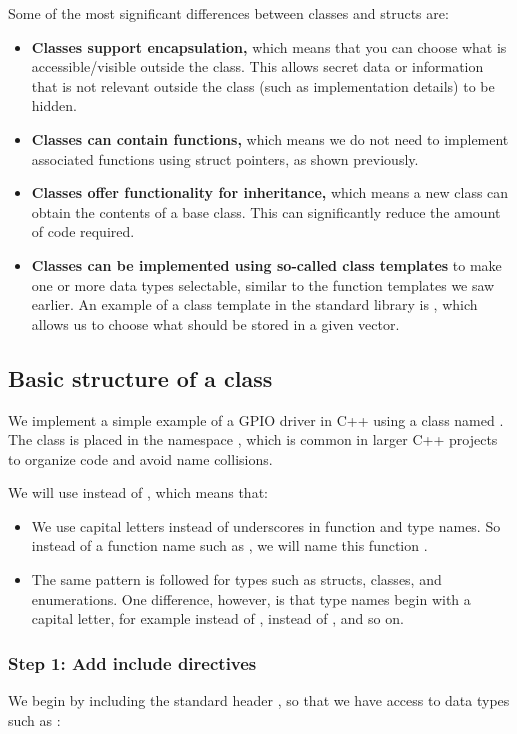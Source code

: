 Some of the most significant differences between classes and structs are:
\begin{itemize}
  \item \textbf{Classes support encapsulation,} which means that you can choose what is
    accessible/visible outside the class. This allows secret data or information that is not
    relevant outside the class (such as implementation details) to be hidden.
  \item \textbf{Classes can contain functions,} which means we do not need to implement associated
    functions using struct pointers, as shown previously.
  \item \textbf{Classes offer functionality for inheritance,} which means a new class can obtain
    the contents of a base class. This can significantly reduce the amount of code required.
  \item \textbf{Classes can be implemented using so-called class templates} to make one or more
    data types selectable, similar to the function templates we saw earlier. An example of a class
    template in the standard library is , which allows us to choose what should
    be stored in a given vector.
\end{itemize}

\subsection{Basic structure of a class}
\label{c2:sec:structure}
We implement a simple example of a GPIO driver in C++ using a class named . The class is
placed in the namespace , which is common in larger C++ projects to organize
code and avoid name collisions.

We will use  instead of , which means that:
\begin{itemize}
  \item We use capital letters instead of underscores in function and type names. So instead of a
    function name such as , we will name this function
    .
  \item The same pattern is followed for types such as structs, classes, and enumerations. One
    difference, however, is that type names begin with a capital letter, for example 
    instead of ,  instead of , and so on.
\end{itemize}

\subsubsection{Step 1: Add include directives}
We begin by including the standard header , so that we have access to data types
such as :

